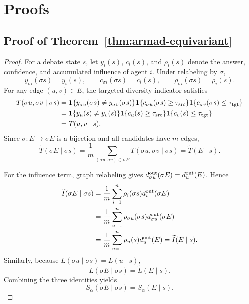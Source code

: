 \newpage
\onecolumn

\section{Proofs}
\label{app:theory-proofs}

\subsection{Proof of Theorem~\ref{thm:armad-equivariant}}
\label{app:armad-equivariant}

\begin{proof}
    
For a debate state $s$, let $y_i(s)$, $c_i(s)$, and $\rho_i(s)$ denote the
answer, confidence, and accumulated influence of agent $i$. Under relabeling by
$\sigma$,
\[
    y_{\sigma i}(\sigma s)=y_i(s),
    \qquad
    c_{\sigma i}(\sigma s)=c_i(s),
    \qquad
    \rho_{\sigma i}(\sigma s)=\rho_i(s).
\]
For any edge $(u,v)\in E$, the targeted-diversity indicator satisfies
\[
\begin{aligned}
    T(\sigma u,\sigma v\mid \sigma s)
    &=
    \mathbf 1\{y_{\sigma u}(\sigma s)\ne y_{\sigma v}(\sigma s)\}
    \mathbf 1\{c_{\sigma u}(\sigma s)\ge \tau_{\rm src}\}
    \mathbf 1\{c_{\sigma v}(\sigma s)\le \tau_{\rm tgt}\} \\
    &=
    \mathbf 1\{y_u(s)\ne y_v(s)\}
    \mathbf 1\{c_u(s)\ge \tau_{\rm src}\}
    \mathbf 1\{c_v(s)\le \tau_{\rm tgt}\} \\
    &=T(u,v\mid s).
\end{aligned}
\]
Since $\sigma:E\to\sigma E$ is a bijection and all candidates have $m$ edges,
\[
    \widetilde T(\sigma E\mid \sigma s)
    =
    \frac{1}{m}
    \sum_{(\sigma u,\sigma v)\in\sigma E}
    T(\sigma u,\sigma v\mid \sigma s)
    =
    \widetilde T(E\mid s).
\]

For the influence term, graph relabeling gives
$d_{\sigma u}^{\rm out}(\sigma E)=d_u^{\rm out}(E)$. Hence
\[
\begin{aligned}
    \widetilde I(\sigma E\mid \sigma s)
    &=
    \frac{1}{m}
    \sum_{i=1}^n
    \rho_i(\sigma s)d_i^{\rm out}(\sigma E) \\
    &=
    \frac{1}{m}
    \sum_{u=1}^n
    \rho_{\sigma u}(\sigma s)d_{\sigma u}^{\rm out}(\sigma E) \\
    &=
    \frac{1}{m}
    \sum_{u=1}^n
    \rho_u(s)d_u^{\rm out}(E)
    =
    \widetilde I(E\mid s).
\end{aligned}
\]
Similarly, because $L(\sigma u\mid \sigma s)=L(u\mid s)$,
\[
    \widetilde L(\sigma E\mid \sigma s)
    =
    \widetilde L(E\mid s).
\]
Combining the three identities yields
\[
    S_\alpha(\sigma E\mid \sigma s)=S_\alpha(E\mid s).
\]


\end{proof}

